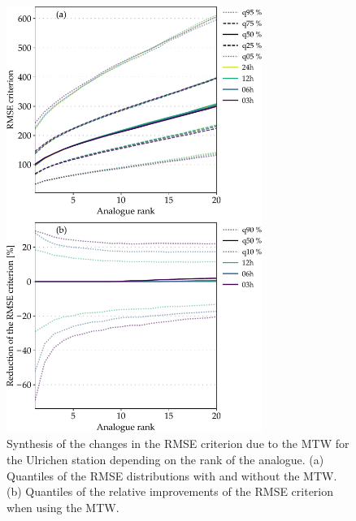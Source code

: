 \documentclass[hess, manuscript]{copernicus}
\begin{document}
	\begin{figure}[htb]
		\begin{center}
			\includegraphics[width=8.3cm]{fig08.pdf}
		\end{center}
		\caption{Synthesis of the changes in the RMSE criterion due to the MTW for the Ulrichen station depending on the rank of the analogue. (a) Quantiles of the RMSE distributions with and without the MTW. (b) Quantiles of the relative improvements of the RMSE criterion when using the MTW.}
		\label{fig:changes_RMSE}
	\end{figure}
	
\end{document}
